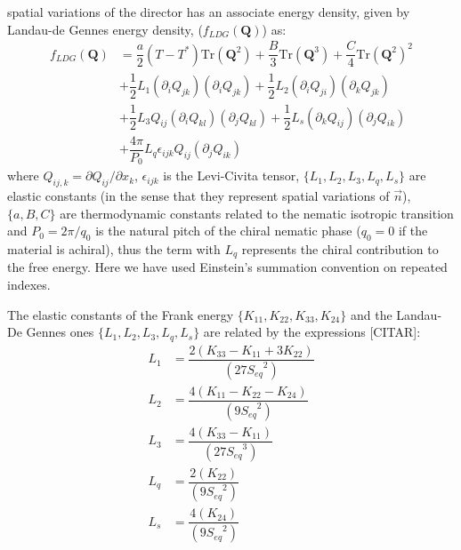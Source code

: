 \documentclass[final,5p,times,twocolumn]{elsarticle}
\begin{document}
spatial variations of the director has an associate energy density,
given by Landau-de Gennes energy density, ($f_{LDG}(\mathbf{Q})$) as:
\begin{align}\label{eq:Landau_deGennes} \nonumber
  f_{LDG}(\mathbf{Q})&=\dfrac{a}{2}(T-T^*) \text{Tr}(\mathbf{Q}^2) +
                       \dfrac{B}{3} \text{Tr}(\mathbf{Q}^3)
                       +  \dfrac{C}{4} \text{Tr}(\mathbf{Q}^2)^2 \\ \nonumber
                     &+ \dfrac{1}{2} L_1 \left( \partial_i Q_{jk} \right)
                       \left( \partial_i Q_{jk} \right) + \dfrac{1}{2} L_2
                       \left( \partial_i Q_{ji} \right) \left( \partial_k Q_{jk} \right) \\
                     &+\dfrac{1}{2} L_3 Q_{ij}\left( \partial_i Q_{kl}\right) \left(\partial_j Q_{kl}\right)
                     +\dfrac{1}{2} L_s \left( \partial_k Q_{ij} \right)\left( \partial_j Q_{ik} \right)\\
                     &+ \dfrac{4 \pi}{P_0} L_q \epsilon_{ijk} Q_{ij}\left( \partial_j Q_{ik} \right)                     
\end{align}
where $Q_{ij,k}=\partial Q_{ij}/\partial x_k$, $\epsilon_{ijk}$ is
the Levi-Civita tensor, $\lbrace L_1 ,L_2,L_3, L_q, L_s \rbrace$ are
elastic constants (in the sense that they represent spatial variations of $\vec{n}$), $\lbrace a,B,C \rbrace$ are thermodynamic
constants related to the nematic isotropic transition and $P_0=2\pi/q_0$ is the natural pitch of the chiral nematic phase ($q_0=0$ if the material is achiral), thus the term with $L_q$ represents the chiral contribution to the free energy. Here we have used Einstein's summation convention on repeated indexes.

The elastic constants of the Frank energy $\lbrace K_{11}, K_{22}, K_{33}, K_{24} \rbrace$ and the Landau-De Gennes ones $\lbrace L_1 ,L_2,L_3, L_q, L_s \rbrace$ are related by the expressions [CITAR]:
\begin{align}\label{eq:frank_to_ldg} \nonumber
L_1&=\dfrac{2 (K_{33}-K_{11}+3 K_{22})}{(27 {S_{eq}}^2)}\\\nonumber
L_2&=\dfrac{4 (K_{11}-K_{22}-K_{24})}{(9 {S_{eq}}^2)}\\\nonumber
L_3&=\dfrac{4 (K_{33}-K_{11})}{(27 {S_{eq}}^3 )}\\\nonumber
L_q&=\dfrac{2 (K_{22})}{(9 {S_{eq}}^2)}\\
L_s&=\dfrac{4 (K_{24})}{(9 {S_{eq}}^2)}
\end{align}
\end{document}
